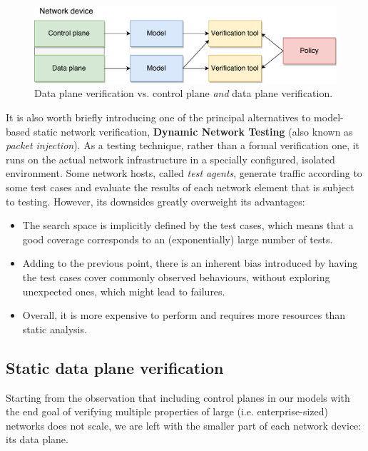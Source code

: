 \begin{figure}[h]
  \centering
  \includegraphics[scale=0.5]{src/img/control-data}
  \caption{Data plane verification vs. control plane \emph{and} data plane
  verification.}
  \label{fig:control-data-verif}
\end{figure}

It is also worth briefly introducing one of the principal alternatives to
model-based static network verification, \textbf{Dynamic Network Testing} (also
known as \emph{packet injection}). As a testing technique, rather than a formal
verification one, it runs on the actual network infrastructure in a specially
configured, isolated environment.  Some network hosts, called \emph{test
agents}, generate traffic according to some test cases and evaluate the results
of each network element that is subject to testing.  However, its downsides
greatly overweight its advantages:

\begin{itemize}
  \item The search space is implicitly defined by the test cases, which means
    that a good coverage corresponds to an (exponentially) large number of
    tests.
  \item Adding to the previous point, there is an inherent bias introduced by
    having the test cases cover commonly observed behaviours, without exploring
    unexpected ones, which might lead to failures.
  \item Overall, it is more expensive to perform and requires more resources
    than static analysis.
\end{itemize}


\subsection{Static data plane verification}\label{sub-sec:static-dp-verif}

Starting from the observation that including control planes in our models with
the end goal of verifying multiple properties of large (i.e.  enterprise-sized)
networks does not scale, we are left with the smaller part of each network
device: its data plane.

